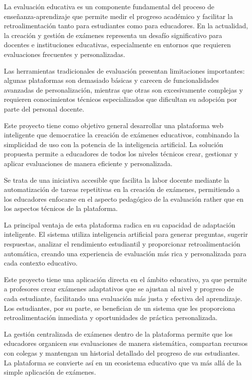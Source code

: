 \documentclass[12pt,a4paper]{report}
\begin{document}
La evaluación educativa es un componente fundamental del proceso de enseñanza-aprendizaje que permite medir el progreso académico y facilitar la retroalimentación tanto para estudiantes como para educadores. En la actualidad, la creación y gestión de exámenes representa un desafío significativo para docentes e instituciones educativas, especialmente en entornos que requieren evaluaciones frecuentes y personalizadas.

Las herramientas tradicionales de evaluación presentan limitaciones importantes: algunas plataformas son demasiado básicas y carecen de funcionalidades avanzadas de personalización, mientras que otras son excesivamente complejas y requieren conocimientos técnicos especializados que dificultan su adopción por parte del personal docente.

Este proyecto tiene como objetivo general desarrollar una plataforma web inteligente que democratice la creación de exámenes educativos, combinando la simplicidad de uso con la potencia de la inteligencia artificial. La solución propuesta permite a educadores de todos los niveles técnicos crear, gestionar y aplicar evaluaciones de manera eficiente y personalizada.

Se trata de una iniciativa accesible que facilita la labor docente mediante la automatización de tareas repetitivas en la creación de exámenes, permitiendo a los educadores enfocarse en el aspecto pedagógico de la evaluación rather que en los aspectos técnicos de la plataforma.

La principal ventaja de esta plataforma radica en su capacidad de adaptación inteligente. El sistema utiliza inteligencia artificial para generar preguntas, sugerir respuestas, analizar el rendimiento estudiantil y proporcionar retroalimentación automática, creando una experiencia de evaluación más rica y personalizada para cada contexto educativo.

Este proyecto tiene una aplicación directa en el ámbito educativo, ya que permite a profesores crear exámenes adaptativos que se ajustan al nivel y progreso de cada estudiante, facilitando una evaluación más justa y efectiva del aprendizaje. Los estudiantes, por su parte, se benefician de un sistema que les proporciona retroalimentación inmediata y oportunidades de práctica personalizada.

La gestión centralizada de exámenes dentro de la plataforma permite que los educadores organicen sus evaluaciones de manera sistemática, compartan recursos con colegas y mantengan un historial detallado del progreso de sus estudiantes. La plataforma se convierte así en un ecosistema educativo que va más allá de la simple aplicación de exámenes.
\end{document}
